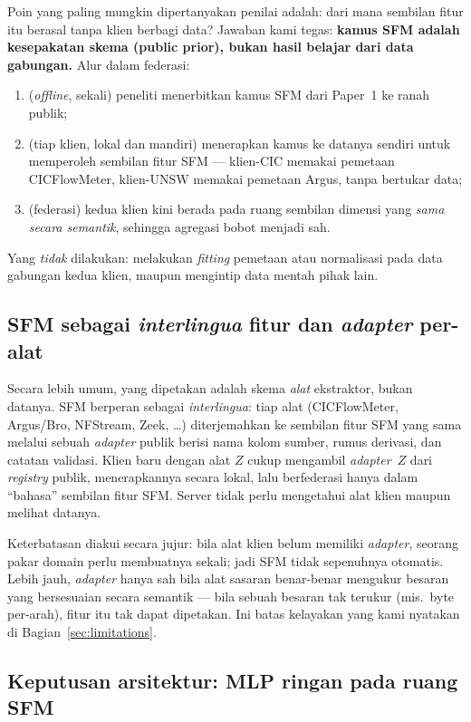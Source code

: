 \documentclass[11pt,a4paper]{article}
\begin{document}
Poin yang paling mungkin dipertanyakan penilai adalah: dari mana sembilan fitur
itu berasal tanpa klien berbagi data? Jawaban kami tegas: \textbf{kamus SFM adalah
kesepakatan skema (public prior), bukan hasil belajar dari data gabungan.} Alur
dalam federasi:
\begin{enumerate}
  \item (\emph{offline}, sekali) peneliti menerbitkan kamus SFM dari Paper~1 ke ranah publik;
  \item (tiap klien, lokal dan mandiri) menerapkan kamus ke datanya sendiri untuk
  memperoleh sembilan fitur SFM --- klien-CIC memakai pemetaan CICFlowMeter,
  klien-UNSW memakai pemetaan Argus, tanpa bertukar data;
  \item (federasi) kedua klien kini berada pada ruang sembilan dimensi yang
  \emph{sama secara semantik}, sehingga agregasi bobot menjadi sah.
\end{enumerate}
Yang \emph{tidak} dilakukan: melakukan \emph{fitting} pemetaan atau normalisasi
pada data gabungan kedua klien, maupun mengintip data mentah pihak lain.

\subsection{SFM sebagai \emph{interlingua} fitur dan \emph{adapter} per-alat}
\label{sec:adapter}

Secara lebih umum, yang dipetakan adalah skema \emph{alat} ekstraktor, bukan
datanya. SFM berperan sebagai \emph{interlingua}: tiap alat (CICFlowMeter,
Argus/Bro, NFStream, Zeek, \dots) diterjemahkan ke sembilan fitur SFM yang sama
melalui sebuah \emph{adapter} publik berisi nama kolom sumber, rumus derivasi, dan
catatan validasi. Klien baru dengan alat $Z$ cukup mengambil \emph{adapter}~$Z$
dari \emph{registry} publik, menerapkannya secara lokal, lalu berfederasi hanya
dalam ``bahasa'' sembilan fitur SFM. Server tidak perlu mengetahui alat klien
maupun melihat datanya.

Keterbatasan diakui secara jujur: bila alat klien belum memiliki \emph{adapter},
seorang pakar domain perlu membuatnya sekali; jadi SFM tidak sepenuhnya otomatis.
Lebih jauh, \emph{adapter} hanya sah bila alat sasaran benar-benar mengukur besaran
yang bersesuaian secara semantik --- bila sebuah besaran tak terukur (mis.\ byte
per-arah), fitur itu tak dapat dipetakan. Ini batas kelayakan yang kami nyatakan di
Bagian~\ref{sec:limitations}.

\subsection{Keputusan arsitektur: MLP ringan pada ruang SFM}
\label{sec:arch}
\end{document}
